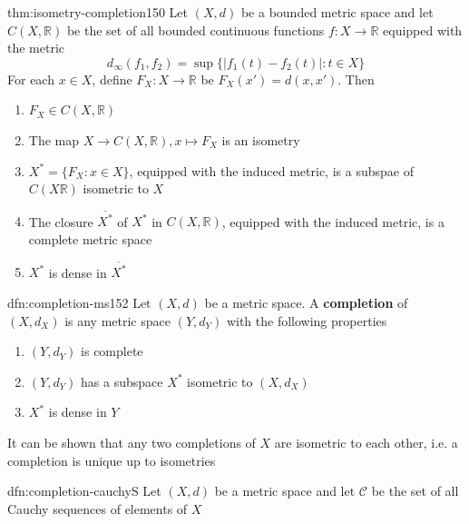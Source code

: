 \documentclass[landscape, 8pt]{extarticle}
\begin{document}
\begin{multicols}{3}
\begin{thm}{thm:isometry-completion}{150}
    \vspace{-5pt}
    Let $(X, d)$ be a bounded metric space and let $C(X, \mathbb{R})$ be the set of all bounded continuous functions $f : X \to \mathbb{R}$ equipped with the metric
    \[d_{\infty}(f_{1}, f_{2}) = \sup \{\lvert f_{1}(t) - f_{2}(t) \rvert : t\in X\}\]
    For each $x\in X$, define $F_{X} : X \to \mathbb{R}$ be $F_{X}(x') = d(x, x')$. Then
    \vspace{-5pt}
    \begin{enumerate}[leftmargin=*]
        \item $F_{X} \in C(X, \mathbb{R})$
        \item The map $X \to C(X, \mathbb{R}), x \mapsto F_{X}$ is an isometry
        \item $X^{*} = \{F_{X} : x\in X\}$, equipped with the induced metric, is a subspae of $C(X \mathbb{R})$ isometric to $X$
        \item The closure $\overline{X^{*}}$ of $X^{*}$ in $C(X, \mathbb{R})$, equipped with the induced metric, is a complete metric space
        \item $X^{*}$ is dense in $\overline{X^{*}}$
    \end{enumerate}
\end{thm}

\begin{dfn}{dfn:completion-ms}{152}
    \vspace{-5pt}
    Let $(X, d)$ be a metric space. A \textbf{completion} of $(X, d_{X})$ is any metric space $(Y, d_{Y})$ with the following properties
    \vspace{-5pt}
    \begin{enumerate}
        \item $(Y, d_{Y})$ is complete
        \item $(Y, d_{Y})$ has a subspace $X^{*}$ isometric to $(X, d_{X})$
        \item $X^{*}$ is dense in $Y$
    \end{enumerate}
    \vspace{-5pt}

    It can be shown that any two completions of $X$ are isometric to each other, i.e. a completion is unique up to isometries
\end{dfn}

\begin{dfn}{dfn:completion-cauchy}{S}
    \vspace{-5pt}
    Let $(X, d)$ be a metric space and let $\mathcal{C}$ be the set of all Cauchy sequences of elements of $X$


\end{dfn}
\end{multicols}
\end{document}
